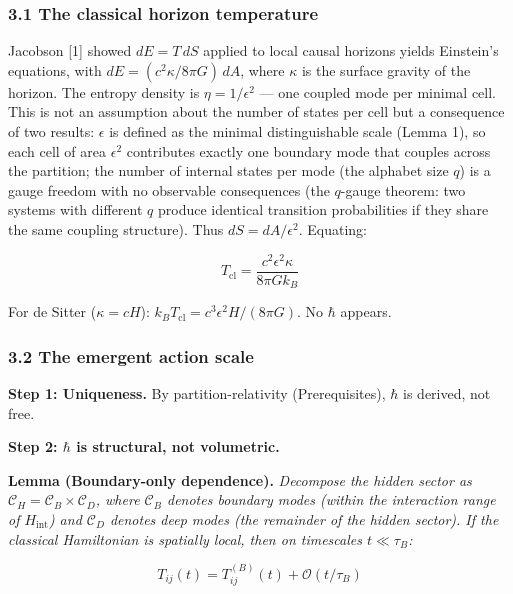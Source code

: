 \documentclass[
]{article}
\begin{document}
\hypertarget{the-classical-horizon-temperature}{%
\subsubsection{3.1 The classical horizon
temperature}\label{the-classical-horizon-temperature}}

Jacobson {[}1{]} showed \(dE = T\,dS\) applied to local causal horizons
yields Einstein's equations, with \(dE = (c^2 \kappa / 8\pi G)\,dA\),
where \(\kappa\) is the surface gravity of the horizon. The entropy
density is \(\eta = 1/\epsilon^2\) --- one coupled mode per minimal
cell. This is not an assumption about the number of states per cell but
a consequence of two results: \(\epsilon\) is defined as the minimal
distinguishable scale (Lemma 1), so each cell of area \(\epsilon^2\)
contributes exactly one boundary mode that couples across the partition;
the number of internal states per mode (the alphabet size \(q\)) is a
gauge freedom with no observable consequences (the \(q\)-gauge theorem:
two systems with different \(q\) produce identical transition
probabilities if they share the same coupling structure). Thus
\(dS = dA/\epsilon^2\). Equating:

\[T_{\text{cl}} = \frac{c^2 \epsilon^2 \kappa}{8\pi G k_B}\]

For de Sitter (\(\kappa = cH\)):
\(k_B T_{\text{cl}} = c^3 \epsilon^2 H / (8\pi G)\). No \(\hbar\)
appears.

\hypertarget{the-emergent-action-scale}{%
\subsubsection{3.2 The emergent action
scale}\label{the-emergent-action-scale}}

\textbf{Step 1: Uniqueness.} By partition-relativity (Prerequisites),
\(\hbar\) is derived, not free.

\textbf{Step 2: \(\hbar\) is structural, not volumetric.}

\textbf{Lemma (Boundary-only dependence).} \emph{Decompose the hidden
sector as \(\mathcal{C}_H = \mathcal{C}_B \times \mathcal{C}_D\), where
\(\mathcal{C}_B\) denotes boundary modes (within the interaction range
of \(H_{\text{int}}\)) and \(\mathcal{C}_D\) denotes deep modes (the
remainder of the hidden sector). If the classical Hamiltonian is
spatially local, then on timescales \(t \ll \tau_B\):}

\[T_{ij}(t) = T^{(B)}_{ij}(t) + \mathcal{O}(t/\tau_B)\]
\end{document}

